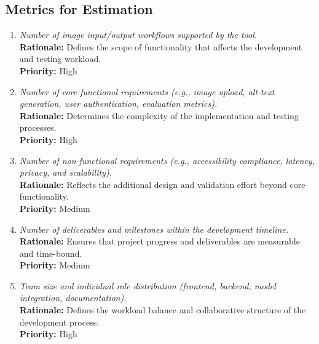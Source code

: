 \documentclass[12pt]{article}
\begin{document}
\subsection{Metrics for Estimation}
\begin{enumerate}[label=C-ME \arabic*., wide=0pt, leftmargin=*]
\item \emph{Number of image input/output workflows supported by the tool.}\\[2mm] 
    {\bf Rationale:} Defines the scope of functionality that affects the development and testing workload.\\
    {\bf Priority:} High

\item \emph{Number of core functional requirements (e.g., image upload, alt-text generation, user authentication, evaluation metrics).}\\[2mm] 
    {\bf Rationale:} Determines the complexity of the implementation and testing processes.\\
    {\bf Priority:} High

\item \emph{Number of non-functional requirements (e.g., accessibility compliance, latency, privacy, and scalability).}\\[2mm] 
    {\bf Rationale:} Reflects the additional design and validation effort beyond core functionality.\\
    {\bf Priority:} Medium

\item \emph{Number of deliverables and milestones within the development timeline.}\\[2mm] 
    {\bf Rationale:} Ensures that project progress and deliverables are measurable and time-bound.\\
    {\bf Priority:} Medium

\item \emph{Team size and individual role distribution (frontend, backend, model integration, documentation).}\\[2mm] 
    {\bf Rationale:} Defines the workload balance and collaborative structure of the development process.\\
    {\bf Priority:} High
\end{enumerate}
\end{document}
